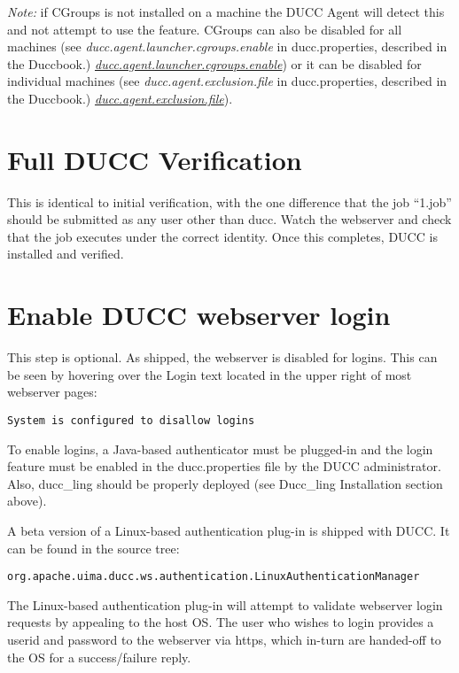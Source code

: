 {\em Note:} if CGroups is not installed on a machine the DUCC Agent will detect this and not 
  	attempt to use the feature. CGroups can also be disabled for all machines
   	(see 
   \ifdefined\DUCCSTANDALONE
   {\em ducc.agent.launcher.cgroups.enable} in ducc.properties, described in the Duccbook.)
   \else
   \hyperref[itm:props-agent.cgroups.enable] {\em ducc.agent.launcher.cgroups.enable}) 
   \fi
   	or it can be disabled for individual machines (see 
   \ifdefined\DUCCSTANDALONE
   {\em ducc.agent.exclusion.file} in ducc.properties, described in the Duccbook.)
   \else
   \hyperref[itm:props-agent.cgroups.exclusion]{\em ducc.agent.exclusion.file}).
   \fi


 
\section{Full DUCC Verification}

This is identical to initial verification, with the one difference that the job ``1.job'' should be
submitted as any user other than ducc.  Watch the webserver and check that the job executes
under the correct identity.  Once this completes, DUCC is installed and verified.
 
\section{Enable DUCC webserver login}

    This step is optional.  As shipped, the webserver is disabled for
    logins.  This can be seen by hovering over the Login text located in the
    upper right of most webserver pages: 
\begin{verbatim}
System is configured to disallow logins
\end{verbatim}

    To enable logins, a Java-based authenticator must be plugged-in and the
    login feature must be enabled in the ducc.properties file by the DUCC
    administrator.  Also, ducc\_ling should be properly deployed (see 
    Ducc\_ling Installation section above).
    
    A beta version of a Linux-based authentication plug-in is shipped with DUCC.
    It can be found in the source tree:
\begin{verbatim}
org.apache.uima.ducc.ws.authentication.LinuxAuthenticationManager
\end{verbatim}

    The Linux-based authentication plug-in will attempt to validate webserver
    login requests by appealing to the host OS.  The user who wishes to
    login provides a userid and password to the webserver via https, which
    in-turn are handed-off to the OS for a success/failure reply.
    
